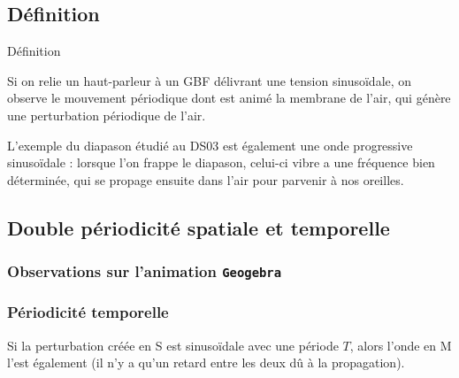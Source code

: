\documentclass[../main/main.tex]{subfiles}
\begin{document}
\subsection{Définition}

\begin{rdefi}{\tiny Définition}
\end{rdefi}

Si on relie un haut-parleur à un GBF délivrant une tension sinusoïdale, on
observe le mouvement périodique dont est animé la membrane de l’air, qui génère
une perturbation périodique de l’air.

L’exemple du diapason étudié au DS03 est également une onde progressive
sinusoïdale : lorsque l’on frappe le diapason, celui-ci vibre a une fréquence
bien déterminée, qui se propage ensuite dans l’air pour parvenir à nos oreilles.

\subsection{Double périodicité spatiale et temporelle}
\subsubsection{Observations sur l'animation \texttt{Geogebra}}
\vspace{-20pt}
\vspace{-10pt}

\subsubsection{Périodicité temporelle}
Si la perturbation créée en S est sinusoïdale avec une période $T$, alors l’onde
en M l’est également (il n’y a qu’un retard entre les deux dû à la propagation).
\end{document}
